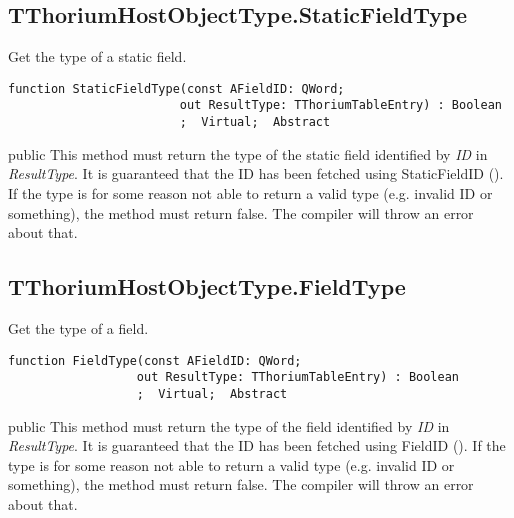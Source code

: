 \subsection{TThoriumHostObjectType.StaticFieldType}
\label{thoriumcorepkg:thorium:tthoriumhostobjecttype:staticfieldtype}
\begin{FPCList}
\Synopsis
Get the type of a static field.\Declaration 

\begin{verbatim}
function StaticFieldType(const AFieldID: QWord;
                        out ResultType: TThoriumTableEntry) : Boolean
                        ;  Virtual;  Abstract
\end{verbatim}
\Visibility
public
\Description
This method must return the type of the static field identified by \textit{ID} in \textit{ResultType}. It is guaranteed that the ID has been fetched using StaticFieldID (\pageref{thoriumcorepkg:thorium:tthoriumhostobjecttype:staticfieldid}). If the type is for some reason not able to return a valid type (e.g. invalid ID or something), the method must return false. The compiler will throw an error about that.\end{FPCList}
\subsection{TThoriumHostObjectType.FieldType}
\label{thoriumcorepkg:thorium:tthoriumhostobjecttype:fieldtype}
\begin{FPCList}
\Synopsis
Get the type of a field.\Declaration 

\begin{verbatim}
function FieldType(const AFieldID: QWord;
                  out ResultType: TThoriumTableEntry) : Boolean
                  ;  Virtual;  Abstract
\end{verbatim}
\Visibility
public
\Description
This method must return the type of the field identified by \textit{ID} in \textit{ResultType}. It is guaranteed that the ID has been fetched using FieldID (\pageref{thoriumcorepkg:thorium:tthoriumhostobjecttype:fieldid}). If the type is for some reason not able to return a valid type (e.g. invalid ID or something), the method must return false. The compiler will throw an error about that.\end{FPCList}
